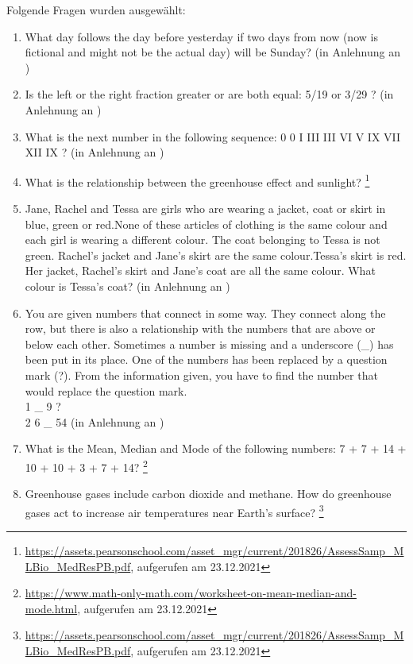 Folgende Fragen wurden ausgewählt:
\begin{enumerate}
  \item What day follows the day before yesterday if two days from now (now is fictional and might not be the actual day) will be Sunday? (in Anlehnung an \parencite[6]{Gruber.2010})
  \item Is the left or the right fraction greater or are both equal: 5/19 or 3/29 ? (in Anlehnung an \parencite[30]{Gruber.2010})
  \item What is the next number in the following sequence: 0 0 I III III VI V IX VII XII IX ? (in Anlehnung an \parencite[7]{Gruber.2010})
  \item What is the relationship between the greenhouse effect and sunlight? \footnote{\url{https://assets.pearsonschool.com/asset_mgr/current/201826/AssessSamp_MLBio_MedResPB.pdf}, aufgerufen am 23.12.2021} 
  \item Jane, Rachel and Tessa are girls who are wearing a jacket, coat or skirt in blue, green or red.None of these articles of clothing is the same colour and each girl is wearing a different colour. The coat belonging to Tessa is not green. Rachel’s jacket and Jane’s skirt are the same colour.Tessa’s skirt is red. Her jacket, Rachel’s skirt and Jane’s coat are all the same colour. What colour is Tessa’s coat? (in Anlehnung an \parencite[96]{Barrett.2012})
  \item You are given numbers that connect in some way. They connect along the row, but there is also a relationship with the numbers that are above or below each other. Sometimes a number is missing and a underscore (\_) has been put in its place. One of the numbers has been replaced by a question mark (?). From the information given, you have to find the number that would replace the question mark. \\
  1  \_  9  ? \\
  2  6  \_  54 (in Anlehnung an \parencite[64]{Barrett.2012})
  \item What is the Mean, Median and Mode of the following numbers: 7 + 7 + 14 + 10 + 10 + 3 + 7 + 14? \footnote{\url{https://www.math-only-math.com/worksheet-on-mean-median-and-mode.html}, aufgerufen am 23.12.2021} 
  \item Greenhouse gases include carbon dioxide and methane. How do greenhouse gases act to increase air temperatures near Earth’s surface? \footnote{\url{https://assets.pearsonschool.com/asset_mgr/current/201826/AssessSamp_MLBio_MedResPB.pdf}, aufgerufen am 23.12.2021} 
\end{enumerate}

